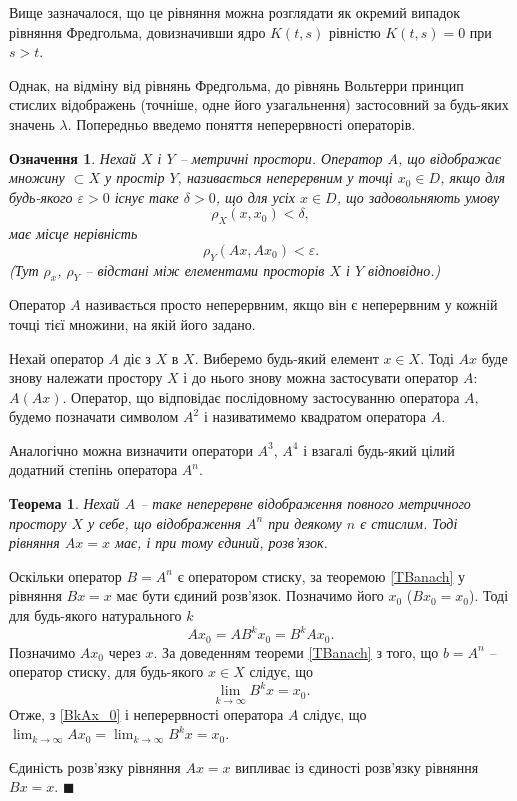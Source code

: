 \documentclass[14pt,twoside]{extreport}
\theoremstyle{mystyle}
\newtheorem{dfn}{Означення}
\newtheorem{thm}{Теорема}
\renewenvironment{proof}{{\bfseries Доведення.}}{$\blacksquare$}
\numberwithin{equation}{chapter}
\begin{document}
Вище зазначалося, що це рівняння можна розглядати як окремий випадок рівняння Фредгольма, довизначивши ядро $K(t, s)$ рівністю $K (t, s) = 0$ при $s> t$.

Однак, на відміну від рівнянь Фредгольма, до рівнянь Вольтерри принцип стислих відображень (точніше, одне його узагальнення) застосовний за будь-яких значень $\lambda$. Попередньо введемо поняття неперервності операторів.
\begin{dfn}
Нехай $X$ і $Y$ -- метричні простори. Оператор $A$, що відображає множину $\subset X$ у простір $Y$, називається неперервним у точці $x_0 \in D$, якщо для будь-якого $\varepsilon > 0$ існує таке $\delta > 0$, що для усіх $x \in D$, що задовольняють умову
\[
\rho_X(x, x_0) < \delta,
\]
має місце нерівність
\[
 \rho_Y(Ax, Ax_0) < \varepsilon.
\]
(Тут $\rho_x$, $\rho_Y$ -- відстані між елементами просторів $X$ і $Y$ відповідно.)
\end{dfn}

Оператор $A$ називається просто неперервним, якщо він є неперервним у кожній точці тієї множини, на якій його задано.

Нехай оператор $A$ діє з $X$ в $X$. Виберемо будь-який елемент $x \in X$. Тоді $Ax$ буде знову належати простору $X$ і до нього знову можна застосувати оператор $A$: $A(Ax)$. Оператор, що відповідає послідовному застосуванню оператора $A$, будемо позначати символом $A^2$ і називатимемо квадратом оператора $A$.

Аналогічно можна визначити оператори $A^3$, $A^4$ і взагалі будь-який цілий додатний степінь оператора $A^n$.

\begin{thm}\label{Anthm}
Нехай $A$ -- таке неперервне відображення повного метричного простору $X$ у себе, що відображення $A^n$ при деякому $n$ є стислим. Тоді рівняння $Ax = x$ має, і при тому єдиний, розв'язок.
\end{thm}

\begin{proof}
 Оскільки оператор $B=A^n$ є оператором стиску, за теоремою \ref{TBanach} у рівняння $Bx = x$ має бути єдиний розв'язок. Позначимо його $x_0$ ($Bx_0=x_0$). Тоді для будь-якого натурального $k$
 \begin{equation}\label{BkAx_0}
  A x_0 = A B^k x_0 = B^k Ax_0.
 \end{equation}
Позначимо $A x_0$ через $x$. За доведенням теореми \ref{TBanach} з того, що $b=A^n$ -- оператор стиску, для будь-якого $x \in X$ слідує, що
\[
 \lim_{k\to\infty} B^k x = x_0.
\]
Отже, з \eqref{BkAx_0} і неперервності оператора $A$ слідує, що $\lim_{k\to\infty}A x_0 = \lim_{k\to\infty} B^k x = x_0$.

Єдиність розв'язку рівняння $Ax = x$ випливає із єдиності розв'язку рівняння $Bx = x$.
\end{proof}
\end{document}

